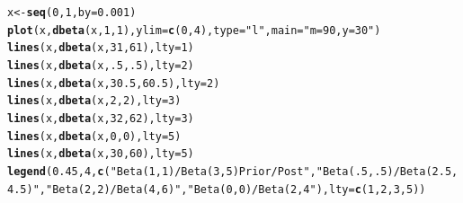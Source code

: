 \documentclass[12pt]{article}\usepackage[]{graphicx}\usepackage[]{color}
\makeatletter
\newcommand{\hlnum}[1]{\textcolor[rgb]{0.686,0.059,0.569}{#1}}%
\newcommand{\hlstr}[1]{\textcolor[rgb]{0.192,0.494,0.8}{#1}}%
\newcommand{\hlstd}[1]{\textcolor[rgb]{0.345,0.345,0.345}{#1}}%
\newcommand{\hlkwb}[1]{\textcolor[rgb]{0.69,0.353,0.396}{#1}}%
\newcommand{\hlkwc}[1]{\textcolor[rgb]{0.333,0.667,0.333}{#1}}%
\newcommand{\hlkwd}[1]{\textcolor[rgb]{0.737,0.353,0.396}{\textbf{#1}}}%
\newenvironment{kframe}{%
 \def\at@end@of@kframe{}%
 \ifinner\ifhmode%
  \def\at@end@of@kframe{\end{minipage}}%
  \begin{minipage}{\columnwidth}%
 \fi\fi%
 \def\FrameCommand##1{\hskip\@totalleftmargin \hskip-\fboxsep
 \colorbox{shadecolor}{##1}\hskip-\fboxsep
     \hskip-\linewidth \hskip-\@totalleftmargin \hskip\columnwidth}%
 \MakeFramed {\advance\hsize-\width
   \@totalleftmargin\z@ \linewidth\hsize
   \@setminipage}}%
 {\par\unskip\endMakeFramed%
 \at@end@of@kframe}
\newenvironment{knitrout}{}{} %
\makeatother
\begin{document}
\begin{knitrout}
\begin{kframe}
\begin{alltt}
\hlstd{x} \hlkwb{<-} \hlkwd{seq}\hlstd{(}\hlnum{0}\hlstd{,}\hlnum{1}\hlstd{,}\hlkwc{by}\hlstd{=}\hlnum{0.001}\hlstd{)}
\hlkwd{plot}\hlstd{(x,} \hlkwd{dbeta}\hlstd{(x,} \hlnum{1}\hlstd{,}\hlnum{1}\hlstd{),} \hlkwc{ylim}\hlstd{=}\hlkwd{c}\hlstd{(}\hlnum{0}\hlstd{,}\hlnum{4}\hlstd{),} \hlkwc{type}\hlstd{=}\hlstr{"l"}\hlstd{,} \hlkwc{main}\hlstd{=}\hlstr{"m=90, y=30"}\hlstd{)}
\hlkwd{lines}\hlstd{(x,} \hlkwd{dbeta}\hlstd{(x,} \hlnum{31}\hlstd{,}\hlnum{61}\hlstd{),} \hlkwc{lty}\hlstd{=}\hlnum{1}\hlstd{)}
\hlkwd{lines}\hlstd{(x,} \hlkwd{dbeta}\hlstd{(x,} \hlnum{.5}\hlstd{,}\hlnum{.5}\hlstd{),} \hlkwc{lty}\hlstd{=}\hlnum{2}\hlstd{)}
\hlkwd{lines}\hlstd{(x,} \hlkwd{dbeta}\hlstd{(x,} \hlnum{30.5}\hlstd{,} \hlnum{60.5}\hlstd{),} \hlkwc{lty}\hlstd{=}\hlnum{2}\hlstd{)}
\hlkwd{lines}\hlstd{(x,} \hlkwd{dbeta}\hlstd{(x,} \hlnum{2}\hlstd{,}\hlnum{2}\hlstd{),} \hlkwc{lty}\hlstd{=}\hlnum{3}\hlstd{)}
\hlkwd{lines}\hlstd{(x,} \hlkwd{dbeta}\hlstd{(x,} \hlnum{32}\hlstd{,} \hlnum{62}\hlstd{),} \hlkwc{lty}\hlstd{=}\hlnum{3}\hlstd{)}
\hlkwd{lines}\hlstd{(x,} \hlkwd{dbeta}\hlstd{(x,} \hlnum{0}\hlstd{,}\hlnum{0}\hlstd{),} \hlkwc{lty}\hlstd{=}\hlnum{5}\hlstd{)}
\hlkwd{lines}\hlstd{(x,} \hlkwd{dbeta}\hlstd{(x,} \hlnum{30}\hlstd{,} \hlnum{60}\hlstd{),} \hlkwc{lty}\hlstd{=}\hlnum{5}\hlstd{)}
\hlkwd{legend}\hlstd{(}\hlnum{0.45}\hlstd{,}\hlnum{4}\hlstd{,} \hlkwd{c}\hlstd{(}\hlstr{"Beta(1,1)/Beta(3,5) Prior/Post"}\hlstd{,} \hlstr{"Beta(.5,.5)/Beta(2.5,4.5)"}\hlstd{,} \hlstr{"Beta(2,2)/Beta(4,6)"}\hlstd{,} \hlstr{"Beta(0,0)/Beta(2,4"}\hlstd{),} \hlkwc{lty}\hlstd{=}\hlkwd{c}\hlstd{(}\hlnum{1}\hlstd{,}\hlnum{2}\hlstd{,}\hlnum{3}\hlstd{,}\hlnum{5}\hlstd{))}
\end{alltt}
\end{kframe}
\end{knitrout}
\end{document}
